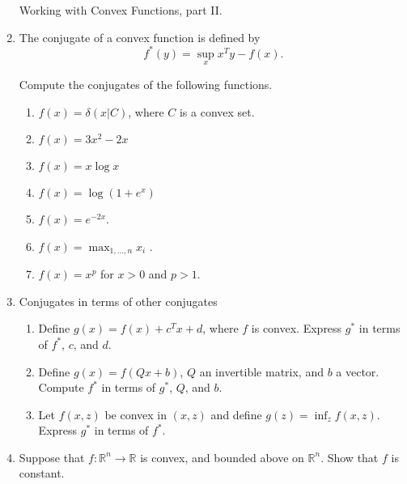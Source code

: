 \documentclass[12pt]{amsart}
\begin{document}
\begin{enumerate}
\newpage

\noindent
{\sf Working with Convex Functions, part II.}

\item The conjugate of a convex function is defined by 
\[
f^*(y) = \sup_x x^Ty - f(x).
\]

Compute the conjugates of the following functions. 
\begin{enumerate}

\item $f(x) = \delta(x|C)$, where $C$ is a convex set.  

\item $f(x) = 3x^2 - 2x$ 

\item $f(x) = x\log x$

\item $f(x) = \log(1 + e^x)$

\item $f(x) = e^{-2x}$.

\item $f(x) = \max_{1, \dots, n} x_i$ . 

\item $f(x) = x^p$ for $x > 0$ and $p > 1$. 

\end{enumerate}

\item Conjugates in terms of other conjugates

\begin{enumerate}

\item Define $g(x) = f(x) + c^Tx + d$, where $f$ is convex. Express $g^*$ in terms of $f^*$, $c$, and $d$. 

\item Define $g(x) = f(Qx + b)$, $Q$ an invertible matrix, and $b$ a vector. Compute $f^*$ in terms of $g^*$, $Q$, and $b$.

\item Let $f(x,z)$ be convex in $(x,z)$ and define $g(z) = \inf_z f(x,z)$. Express $g^*$ in terms of $f^*$.


\end{enumerate}



\item Suppose that $f: \mathbb{R}^n \rightarrow \mathbb{R}$ is convex, and bounded above on $\mathbb{R}^n$. Show that $f$ is constant. 



\end{enumerate}
\end{document}
